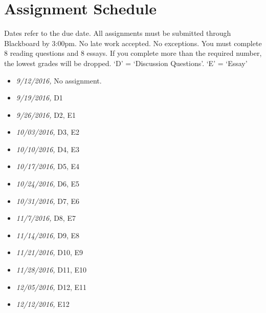 \documentclass[article,oneside]{memoir}
\begin{document}
\section{ Assignment Schedule}
Dates refer to the due date. All assignments must be submitted through Blackboard by 3:00pm. No late work accepted. No exceptions. You must complete 8 reading questions and 8 essays. If you complete more than the required number, the lowest grades will be dropped. `D' = `Discussion Questions'. `E' = `Essay'
\begin{itemize}
\item \textit{9/12/2016,} No assignment.  
\item \textit{9/19/2016,} D1
\item \textit{9/26/2016,} D2, E1
\item \textit{10/03/2016,} D3, E2
\item \textit{10/10/2016,} D4, E3
\item \textit{10/17/2016,} D5, E4
\item \textit{10/24/2016,}  D6, E5
\item \textit{10/31/2016,} D7, E6
\item \textit{11/7/2016,}  D8, E7
\item \textit{11/14/2016,} D9, E8
\item \textit{11/21/2016,} D10, E9
\item \textit{11/28/2016,} D11, E10
\item \textit{12/05/2016,} D12, E11
\item \textit{12/12/2016,} E12
\end{itemize}




\end{document}
